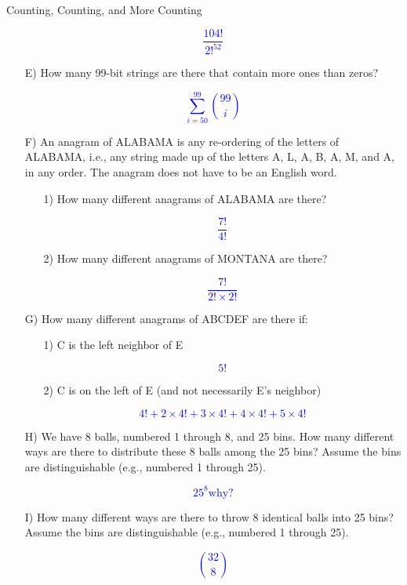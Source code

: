\begin{homeworkProblem}{Counting, Counting, and More Counting}
\begin{itemize}
\textcolor{blue}{\[ \frac{104!}{2!^{52}} \]}
  
\item[E)] How many 99-bit strings are there that contain more ones than 
zeros?

\textcolor{blue}{\[ \sum_{i=50}^{99} \binom{99}{i} \]}
  
\item[F)] An anagram of ALABAMA is any re-ordering of the letters of 
ALABAMA, i.e., any string made up of the letters A, L, A, B, A, M, and 
A, in any order. The anagram does not have to be an English word.
  \begin{itemize}
    \item[1)] How many different anagrams of ALABAMA are there? 
    
    \textcolor{blue}{\[ \frac{7!}{4!} \]}

    \item[2)] How many different anagrams of MONTANA are there?
    
    \textcolor{blue}{\[ \frac{7!}{2! \times 2!} \]}

  \end{itemize}
 
\item[G)] How many different anagrams of ABCDEF are there if:
\begin{itemize}
    \item[1)] C is the left neighbor of E
  
    \textcolor{blue}{\[ 5! \]}

    \item[2)] C is on the left of E (and not necessarily E's neighbor)
    
    \textcolor{blue}{\[ 4! + 2 \times 4! + 3 \times 4! + 4 \times 4! + 
    5 \times 4! \]}

\end{itemize}

\item[H)] We have 8 balls, numbered 1 through 8, and 25 bins. How many 
different ways are there to distribute these 8 balls among the 25 bins? 
Assume the bins are distinguishable (e.g., numbered 1 through 25).

\textcolor{blue}{\[ 25^8 \text{why?} \]}
  
\item[I)] How many different ways are there to throw 8 identical balls 
into 25 bins? Assume the bins are distinguishable (e.g., numbered 1 
through 25).

\textcolor{blue}{\[ \binom{32}{8} \]}


\end{itemize}
\end{homeworkProblem}
